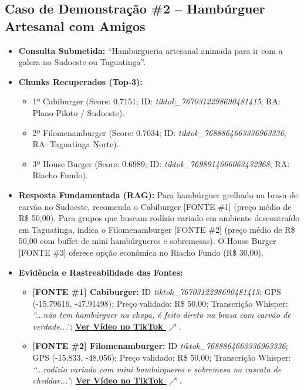 \documentclass[11pt,a4paper]{article}
\begin{document}
\subsection{Caso de Demonstração \#2 -- Hambúrguer Artesanal com Amigos}
\begin{itemize}[leftmargin=1.0cm]
\item \textbf{Consulta Submetida:} ``Hamburgueria artesanal animada para ir com a galera no Sudoeste ou Taguatinga''.
\item \textbf{Chunks Recuperados (Top-3):}
\begin{itemize}
\item 1º Cabiburger (Score: 0.7151; ID: \textit{tiktok\_7670312298690481415}; RA: Plano Piloto / Sudoeste).
\item 2º Filomenamburger (Score: 0.7034; ID: \textit{tiktok\_7688864663336963336}; RA: Taguatinga Norte).
\item 3º House Burger (Score: 0.6989; ID: \textit{tiktok\_7698914666063432968}; RA: Riacho Fundo).
\end{itemize}
\item \textbf{Resposta Fundamentada (RAG):} Para hambúrguer grelhado na brasa de carvão no Sudoeste, recomenda o Cabiburger [FONTE \#1] (preço médio de R\$ 50,00). Para grupos que buscam rodízio variado em ambiente descontraído em Taguatinga, indica o Filomenamburger [FONTE \#2] (preço médio de R\$ 50,00 com buffet de mini hambúrgueres e sobremesas). O House Burger [FONTE \#3] oferece opção econômica no Riacho Fundo (R\$ 30,00).
\item \textbf{Evidência e Rastreabilidade das Fontes:}
\begin{itemize}
\item \textbf{[FONTE \#1] Cabiburger:} ID \textit{tiktok\_7670312298690481415}; GPS (-15.79616, -47.91498); Preço validado: R\$ 50,00; Transcrição Whisper: \textit{``...não tem hambúrguer na chapa, é feito direto na brasa com carvão de verdade...''}; \href{https://www.tiktok.com/@rolezandoembrasilia/video/7670312298690481415}{\textbf{\underline{Ver Vídeo no TikTok $\nearrow$}}}.
\item \textbf{[FONTE \#2] Filomenamburger:} ID \textit{tiktok\_7688864663336963336}; GPS (-15.833, -48.056); Preço validado: R\$ 50,00; Transcrição Whisper: \textit{``...rodízio variado com mini hambúrgueres e sobremesa na cascata de cheddar...''}; \href{https://www.tiktok.com/@rolezandoembrasilia/video/7688864663336963336}{\textbf{\underline{Ver Vídeo no TikTok $\nearrow$}}}.
\end{itemize}
\end{itemize}
\end{document}
